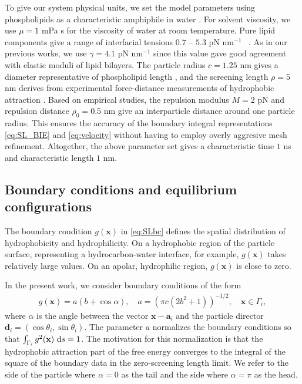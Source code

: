 \documentclass[prb,preprint,showpacs,preprintnumbers,amsmath,amssymb,longbibliography]{revtex4-1}
\renewcommand{\aa}{\mathbf{a}}
\newcommand{\dd}{\mathbf{d}}
\newcommand{\xx}{\mathbf{x}}
\begin{document}
To give our system physical units, we set the model parameters
using phospholipids as a characteristic amphiphile in water \cite{Boal}.
For solvent viscosity, we use $\mu = 1$ mPa s for the viscosity
of water at room temperature.
Pure lipid components give a range
of interfacial tensions $0.7$ -- $5.3$ pN nm$^{-1}$
~\cite{KUZMIN2005, Petelska2012,Jackson2016,GarciaSaez}.
As in our previous works\cite{Fu20,Fu2022_JFM},
we use $\gamma=4.1$ pN nm$^{-1}$ since this value gave
good agreement with elastic moduli of lipid bilayers.
The particle radius $c = 1.25$ nm
gives a diameter representative of phospholipid length \cite{Boal},
and the screening length $\rho = 5$ nm
derives from experimental force-distance measurements of hydrophobic
attraction \cite{ErLjCl89,Lietal05,Israelachvili80,Jackson2016}.
Based on empirical studies, the repulsion modulus $M = 2$ pN
and repulsion distance $\rho_0 = 0.5$ nm give an interparticle
distance around one particle radius.  This 
ensures the accuracy of the boundary integral representations
\eqref{eq:SL_BIE} and \eqref{eq:velocity}
without having to employ overly aggresive mesh refinement. 
Altogether, the above parameter set gives
a characteristic time $1$
ns and characteristic length $1$ nm.

\subsection{Boundary conditions and equilibrium configurations}
The boundary condition $g(\xx)$ in
\eqref{eq:SLbc} defines the spatial distribution of
hydrophobicity and hydrophilicity.  On a hydrophobic region of the
particle surface, representing a hydrocarbon-water interface,
for example, $g(\xx)$ takes relatively large values.
On an apolar, hydrophilic region, $g(\xx)$ is close to zero.

In the present work, we consider boundary conditions of the form
\begin{align}
  \label{eq:bc-type}
g(\xx) = a(b + \cos \alpha),\quad a = (\pi c(2b^2 + 1))^{-1/2},\quad \xx \in \Gamma_i,
\end{align}
where $\alpha$ is the angle between the vector $\xx - \aa_i$ and 
the particle director $\dd_i = (\cos \theta_i, \sin \theta_i)$.
The parameter $a$ normalizes the boundary conditions 
so that $\int_{\Gamma_i} g^2(\xx) \, \dif s =  1$.
The motivation for this normalization is that the hydrophobic attraction
part of the free energy converges to the integral of the square of the boundary
data in the zero-screening length limit.  
We refer to the side of the particle where $\alpha = 0$
as the tail and the side where $\alpha = \pi$ as the head. 
\end{document}
